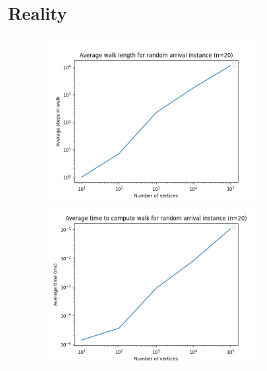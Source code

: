 \documentclass{beamer}
\begin{document}
\begin{frame}
\frametitle{Reality}
    \begin{figure}[t]
        \centering
        \includegraphics[width=2.2in]{walkLength.png}
        \centering
        \includegraphics[width=2.2in]{walkTime.png}
    \end{figure}
    
\end{frame}
\end{document}

